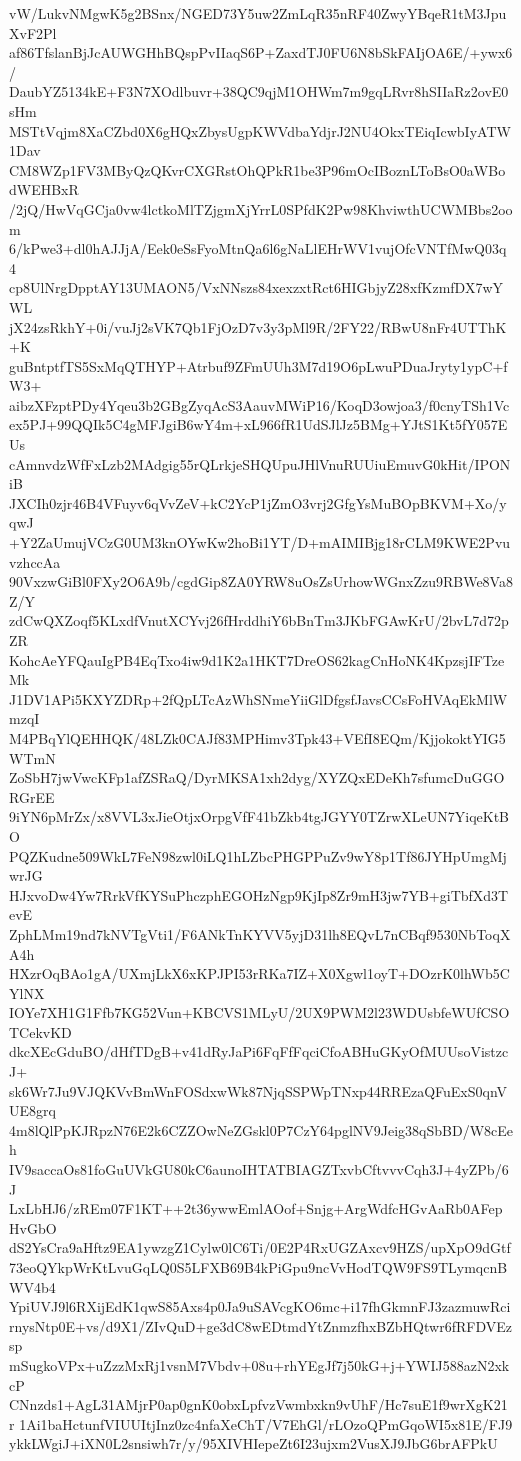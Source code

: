 vW/LukvNMgwK5g2BSnx/NGED73Y5uw2ZmLqR35nRF40ZwyYBqeR1tM3JpuXvF2Pl
af86TfslanBjJcAUWGHhBQspPvIIaqS6P+ZaxdTJ0FU6N8bSkFAIjOA6E/+ywx6/
DaubYZ5134kE+F3N7XOdlbuvr+38QC9qjM1OHWm7m9gqLRvr8hSIIaRz2ovE0sHm
MSTtVqjm8XaCZbd0X6gHQxZbysUgpKWVdbaYdjrJ2NU4OkxTEiqIcwbIyATW1Dav
CM8WZp1FV3MByQzQKvrCXGRstOhQPkR1be3P96mOcIBoznLToBsO0aWBodWEHBxR
/2jQ/HwVqGCja0vw4lctkoMlTZjgmXjYrrL0SPfdK2Pw98KhviwthUCWMBbs2oom
6/kPwe3+dl0hAJJjA/Eek0eSsFyoMtnQa6l6gNaLlEHrWV1vujOfcVNTfMwQ03q4
cp8UlNrgDpptAY13UMAON5/VxNNszs84xexzxtRct6HIGbjyZ28xfKzmfDX7wYWL
jX24zsRkhY+0i/vuJj2sVK7Qb1FjOzD7v3y3pMl9R/2FY22/RBwU8nFr4UTThK+K
guBntptfTS5SxMqQTHYP+Atrbuf9ZFmUUh3M7d19O6pLwuPDuaJryty1ypC+fW3+
aibzXFzptPDy4Yqeu3b2GBgZyqAcS3AauvMWiP16/KoqD3owjoa3/f0cnyTSh1Vc
ex5PJ+99QQIk5C4gMFJgiB6wY4m+xL966fR1UdSJlJz5BMg+YJtS1Kt5fY057EUs
cAmnvdzWfFxLzb2MAdgig55rQLrkjeSHQUpuJHlVnuRUUiuEmuvG0kHit/IPONiB
JXCIh0zjr46B4VFuyv6qVvZeV+kC2YcP1jZmO3vrj2GfgYsMuBOpBKVM+Xo/yqwJ
+Y2ZaUmujVCzG0UM3knOYwKw2hoBi1YT/D+mAIMIBjg18rCLM9KWE2PvuvzhccAa
90VxzwGiBl0FXy2O6A9b/cgdGip8ZA0YRW8uOsZsUrhowWGnxZzu9RBWe8Va8Z/Y
zdCwQXZoqf5KLxdfVnutXCYvj26fHrddhiY6bBnTm3JKbFGAwKrU/2bvL7d72pZR
KohcAeYFQauIgPB4EqTxo4iw9d1K2a1HKT7DreOS62kagCnHoNK4KpzsjIFTzeMk
J1DV1APi5KXYZDRp+2fQpLTcAzWhSNmeYiiGlDfgsfJavsCCsFoHVAqEkMlWmzqI
M4PBqYlQEHHQK/48LZk0CAJf83MPHimv3Tpk43+VEfI8EQm/KjjokoktYIG5WTmN
ZoSbH7jwVwcKFp1afZSRaQ/DyrMKSA1xh2dyg/XYZQxEDeKh7sfumcDuGGORGrEE
9iYN6pMrZx/x8VVL3xJieOtjxOrpgVfF41bZkb4tgJGYY0TZrwXLeUN7YiqeKtBO
PQZKudne509WkL7FeN98zwl0iLQ1hLZbcPHGPPuZv9wY8p1Tf86JYHpUmgMjwrJG
HJxvoDw4Yw7RrkVfKYSuPhczphEGOHzNgp9KjIp8Zr9mH3jw7YB+giTbfXd3TevE
ZphLMm19nd7kNVTgVti1/F6ANkTnKYVV5yjD31lh8EQvL7nCBqf9530NbToqXA4h
HXzrOqBAo1gA/UXmjLkX6xKPJPI53rRKa7IZ+X0Xgwl1oyT+DOzrK0lhWb5CYlNX
IOYe7XH1G1Ffb7KG52Vun+KBCVS1MLyU/2UX9PWM2l23WDUsbfeWUfCSOTCekvKD
dkcXEcGduBO/dHfTDgB+v41dRyJaPi6FqFfFqciCfoABHuGKyOfMUUsoVistzcJ+
sk6Wr7Ju9VJQKVvBmWnFOSdxwWk87NjqSSPWpTNxp44RREzaQFuExS0qnVUE8grq
4m8lQlPpKJRpzN76E2k6CZZOwNeZGskl0P7CzY64pglNV9Jeig38qSbBD/W8cEeh
IV9saccaOs81foGuUVkGU80kC6aunoIHTATBIAGZTxvbCftvvvCqh3J+4yZPb/6J
LxLbHJ6/zREm07F1KT++2t36ywwEmlAOof+Snjg+ArgWdfcHGvAaRb0AFepHvGbO
dS2YsCra9aHftz9EA1ywzgZ1Cylw0lC6Ti/0E2P4RxUGZAxcv9HZS/upXpO9dGtf
73eoQYkpWrKtLvuGqLQ0S5LFXB69B4kPiGpu9ncVvHodTQW9FS9TLymqcnBWV4b4
YpiUVJ9l6RXijEdK1qwS85Axs4p0Ja9uSAVcgKO6mc+i17fhGkmnFJ3zazmuwRci
rnysNtp0E+vs/d9X1/ZIvQuD+ge3dC8wEDtmdYtZnmzfhxBZbHQtwr6fRFDVEzsp
mSugkoVPx+uZzzMxRj1vsnM7Vbdv+08u+rhYEgJf7j50kG+j+YWIJ588azN2xkcP
CNnzds1+AgL31AMjrP0ap0gnK0obxLpfvzVwmbxkn9vUhF/Hc7suE1f9wrXgK21r
1Ai1baHctunfVIUUItjInz0zc4nfaXeChT/V7EhGl/rLOzoQPmGqoWI5x81E/FJ9
ykkLWgiJ+iXN0L2snsiwh7r/y/95XIVHIepeZt6I23ujxm2VusXJ9JbG6brAFPkU
